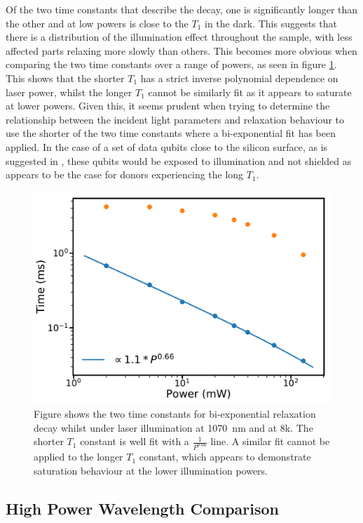 Of the two time constants that describe the decay, one is significantly longer than the other and at low powers is close to the $T_1$ in the dark.
This suggests that there is a distribution of the illumination effect throughout the sample, with less affected parts relaxing more slowly than others.
This becomes more obvious when comparing the two time constants over a range of powers, as seen in figure \ref{fig:T1avsT1b}.
This shows that the shorter $T_1$ has a strict inverse polynomial dependence on laser power, whilst the longer $T_1$ cannot be similarly fit as it appears to saturate at lower powers.
Given this, it seems prudent when trying to determine the relationship between the incident light parameters and relaxation behaviour to use the shorter of the two time constants where a bi-exponential fit has been applied.
In the case of a set of data qubits close to the silicon surface, as is suggested in \cite{OGorman2014}, these qubits would be exposed to illumination and not shielded as appears to be the case for donors experiencing the long $T_1$.



\begin{figure}
\centering
\includegraphics[width = 0.8\columnwidth]{Figures/hpT1avsT1b.pdf}
\caption[Bi-exponential relaxation decay constants]{Figure shows the two time constants for bi-exponential relaxation decay whilst under laser illumination at 1070~nm and at 8k. The shorter $T_1$ constant is well fit with a $\frac{1}{P^{0.66}}$ line. A similar fit cannot be applied to the longer $T_1$ constant, which appears to demonstrate saturation behaviour at the lower illumination powers.}
\label{fig:T1avsT1b}
\end{figure}

\subsection{High Power Wavelength Comparison}
